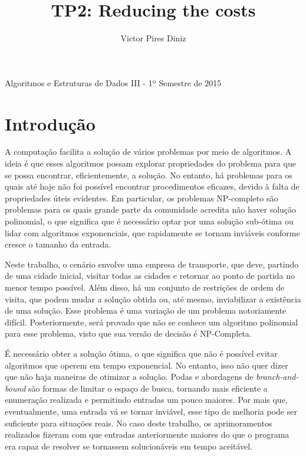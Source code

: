 \documentclass[10pt,a4paper]{article}
\title{TP2: Reducing the costs}
\author{Victor Pires Diniz}
\numberwithin{equation}{section}
\begin{document}
\maketitle
\begin{center}
Algoritmos e Estruturas de Dados III - 1º Semestre de 2015
\end{center}

\section{Introdução}

A computação facilita a solução de vários problemas por meio de algoritmos. A ideia é que esses algoritmos possam explorar propriedades do problema para que se possa encontrar, eficientemente, a solução. No entanto, há problemas para os quais até hoje não foi possível encontrar procedimentos eficazes, devido à falta de propriedades úteis evidentes. Em particular, os problemas NP-completo são problemas para os quais grande parte da comunidade acredita não haver solução polinomial, o que significa que é necessário optar por uma solução sub-ótima ou lidar com algoritmos exponenciais, que rapidamente se tornam inviáveis conforme cresce o tamanho da entrada.

Neste trabalho, o cenário envolve uma empresa de transporte, que deve, partindo de uma cidade inicial, visitar todas as cidades e retornar ao ponto de partida no menor tempo possível. Além disso, há um conjunto de restrições de ordem de visita, que podem mudar a solução obtida ou, até mesmo, inviabilizar a existência de uma solução. Esse problema é uma variação de um problema notoriamente difícil. Posteriormente, será provado que não se conhece um algoritmo polinomial para esse problema, visto que sua versão de decisão é NP-Completa.

É necessário obter a solução ótima, o que significa que não é possível evitar algoritmos que operem em tempo exponencial. No entanto, isso não quer dizer que não haja maneiras de otimizar a solução. Podas e abordagens de \emph{branch-and-bound} são formas de limitar o espaço de busca, tornando mais eficiente a enumeração realizada e permitindo entradas um pouco maiores. Por mais que, eventualmente, uma entrada vá se tornar inviável, esse tipo de melhoria pode ser suficiente para situações reais. No caso deste trabalho, os aprimoramentos realizados fizeram com que entradas anteriormente maiores do que o programa era capaz de resolver se tornassem solucionáveis em tempo aceitável.
\end{document}
